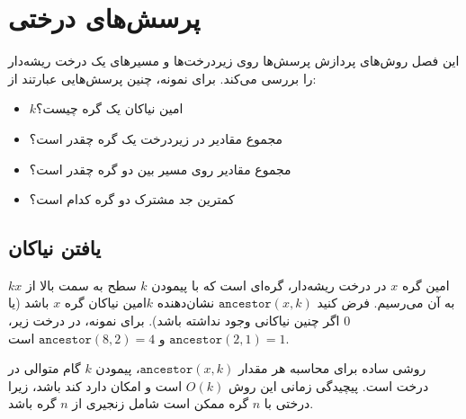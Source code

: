 \chapter{پرسش‌های درختی}


این فصل روش‌های پردازش پرسش‌ها روی زیردرخت‌ها و مسیرهای یک درخت ریشه‌دار را بررسی می‌کند.
برای نمونه، چنین پرسش‌هایی عبارتند از:

\begin{itemize}
\item $k$امین نیاکان یک گره چیست؟
\item مجموع مقادیر در زیردرخت یک گره چقدر است؟
\item مجموع مقادیر روی مسیر بین دو گره چقدر است؟
\item کمترین جد مشترک دو گره کدام است؟
\end{itemize}

\section{یافتن نیاکان}


$k$امین  گره $x$ در درخت ریشه‌دار، گره‌ای است که با پیمودن $k$ سطح به سمت بالا از $x$ به آن می‌رسیم.
فرض کنید $\texttt{ancestor}(x,k)$ نشان‌دهنده $k$امین نیاکان گره $x$ باشد (یا $0$ اگر چنین نیاکانی وجود نداشته باشد).
برای نمونه، در درخت زیر، $\texttt{ancestor}(2,1)=1$ و $\texttt{ancestor}(8,2)=4$ است.
\begin{center}
\end{center}

روشی ساده برای محاسبه هر مقدار $\texttt{ancestor}(x,k)$، پیمودن $k$ گام متوالی در درخت است.
پیچیدگی زمانی این روش $O(k)$ است و امکان دارد کند باشد، زیرا درختی با $n$ گره ممکن است شامل زنجیری از $n$ گره باشد.

